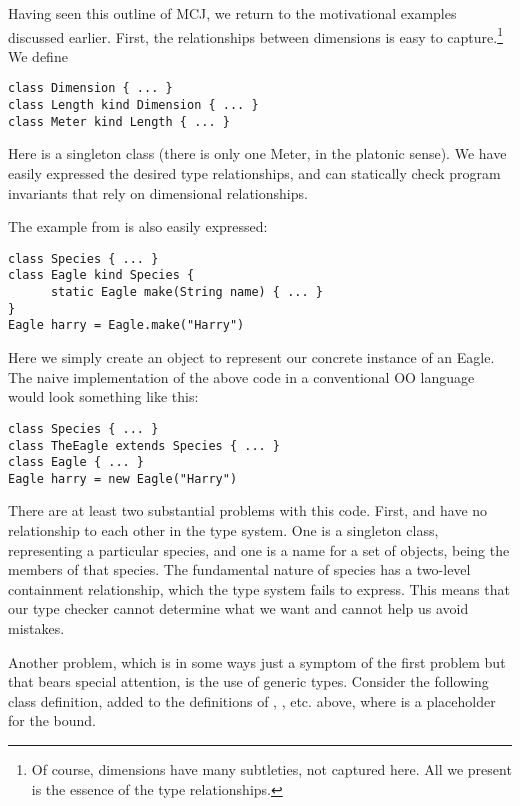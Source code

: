 \documentclass[nocopyrightspace,10pt]{acm-sigplan}
\begin{document}
\label{examples}

Having seen this outline of MCJ, we return to the motivational
examples discussed earlier.  First, the relationships between
dimensions is easy to capture.\footnote{Of course, dimensions have
many subtleties, not captured here.  All we present is the essence of
the type relationships.} We define 

\begin{verbatim}
class Dimension { ... }
class Length kind Dimension { ... }
class Meter kind Length { ... }
\end{verbatim}

Here {} is a singleton class (there is only one Meter, in
the platonic sense).  We have easily expressed the desired type
relationships, and can statically check program invariants that rely
on dimensional relationships.

The example from \cite{FW96} is also easily expressed:

\begin{verbatim}
class Species { ... }
class Eagle kind Species {
      static Eagle make(String name) { ... }
}
Eagle harry = Eagle.make("Harry")
\end{verbatim}

Here we simply create an object to represent our concrete instance of
an Eagle.  The naive implementation of the above code in a
conventional OO language would look something like this:

\begin{verbatim}
class Species { ... }
class TheEagle extends Species { ... }
class Eagle { ... }
Eagle harry = new Eagle("Harry")
\end{verbatim}

There are at least two substantial problems with this code.  First,
{} and {} have no relationship to each other in
the type system.  One is a singleton class, representing a particular
species, and one is a name for a set of objects, being the members of
that species.  The fundamental nature of species has a two-level
containment relationship, which the type system fails to express.
This means that our type checker cannot determine what we want and
cannot help us avoid mistakes.

Another problem, which is in some ways just a symptom of the first
problem but that bears special attention, is the use of generic
types.  Consider the following class definition, added to the
definitions of , , etc. above, where
 is a placeholder for the bound.  
\end{document}
